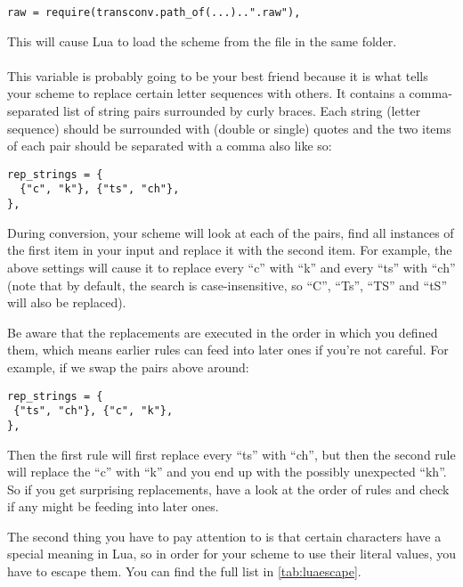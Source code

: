 \documentclass{ltxdockit}
\begin{document}
\begin{lstlisting}
raw = require(transconv.path_of(...)..".raw"),
\end{lstlisting}

This will cause Lua to load the scheme from the  file in the same
folder.

\paragraph{}

This variable is probably going to be your best friend because it is what tells
your scheme to replace certain letter sequences with others. It contains a
comma-separated list of string pairs surrounded by curly braces. Each string
(letter sequence) should be surrounded with (double or single) quotes and the
two items of each pair should be separated with a comma also like so:

\begin{lstlisting}
rep_strings = {
  {"c", "k"}, {"ts", "ch"},
},
\end{lstlisting}

During conversion, your scheme will look at each of the pairs, find all
instances of the first item in your input and replace it with the second item.
For example, the above settings will cause it to replace every \enquote{c} with
\enquote{k} and every \enquote{ts} with \enquote{ch} (note that by
default, the search is case-insensitive, so \enquote{C}, \enquote{Ts},
\enquote{TS} and \enquote{tS} will also be replaced).

Be aware that the replacements are executed in the order in which you defined
them, which means earlier rules can feed into later ones if you're not careful.
For example, if we swap the pairs above around:

\begin{lstlisting}
rep_strings = {
 {"ts", "ch"}, {"c", "k"},
},
\end{lstlisting}

Then the first rule will first replace every \enquote{ts} with \enquote{ch}, but
then the second rule will replace the \enquote{c} with \enquote{k} and you end
up with the possibly unexpected \enquote{kh}. So if you get surprising
replacements, have a look at the order of rules and check if any might be
feeding into later ones.

The second thing you have to pay attention to is that certain characters
have a special meaning in Lua, so in order for your scheme to use their literal
values, you have to escape them. You can find the full list in
\autoref{tab:luaescape}.
\end{document}
